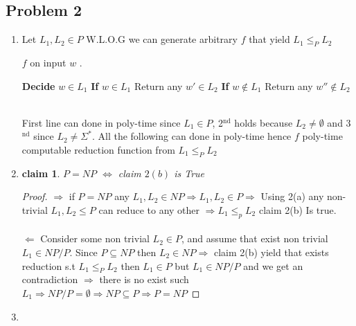 \documentclass[12pt]{article}
\newtheorem*{claim*}{claim}
\begin{document}
\subsection*{Problem 2} \begin{enumerate}[label=(\alph*)]
\item {}

Let $L_1,L_2\in P$ W.L.O.G we can generate arbitrary $f$ that yield $L_1\le_P L_2$ 
\begin{algorithm}
\caption{ $f$ on input $w$ .}\label{alg:cap}
\begin{algorithmic} 
\State  \textbf{Decide}  $w\in L_1$
\State \textbf{If} $w\in L_1$  Return any $w'\in L_2$
\State \textbf{If} $w\notin L_1$  Return any $w''\notin L_2$
\end{algorithmic}
\end{algorithm}
\\First line can  done in poly-time since $L_1\in P$, 2$^{\text{nd}}$ holds  because $L_2\ne \emptyset$ and 3$^{\text{nd}}$ since
$L_2\ne \Sigma ^*$. All the following can done in poly-time hence $f$  poly-time computable reduction function from $L_1\le_P L_2$ \\
\item {}
\begin{claim*} $P=NP$ $ \Leftrightarrow$  claim $2(b)$ is True
\end{claim*}
\begin{proof}$\Rightarrow$ if $P=NP$ any $L_1,L_2\in NP \Rightarrow L_1,L_2\in P \Rightarrow $  Using 2(a)  any non-trivial $L_1,L_2 \le P$  can reduce to any other $\Rightarrow L_1\le_pL_2$ claim 2(b) Is true.
\\\\ $\Leftarrow$ Consider  some non trivial $L_2\in P$,  and assume that exist non trivial $L_1\in NP/P$. Since $P\subseteq NP$ then $L_2\in NP \Rightarrow$ claim 2(b) yield that exists reduction s.t $L_1 \le_P  L_2$ then $L_1\in P$ but  $L_1\in NP/P $ and we get an contradiction $\Rightarrow$ there is no exist such $L_1\Rightarrow NP/ P=\emptyset \Rightarrow NP\subseteq P\Rightarrow P=NP$
\end{proof}
\item {}

\end{enumerate}
\end{document}
